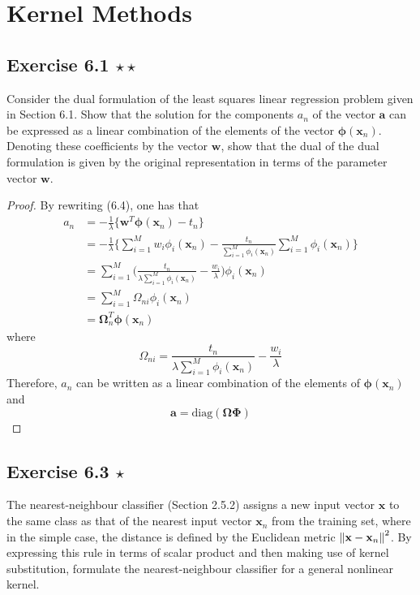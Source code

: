 \chapter{Kernel Methods}

\section*{Exercise 6.1 $\star \star$}
Consider the dual formulation of the least squares linear
regression problem given in Section 6.1. Show that the
solution for the components $a_n$ of the vector
$\mathbf{a}$ can be expressed as a linear combination of the
elements of the vector $\bm{\phi}(\mathbf{x}_n)$. Denoting 
these coefficients by the vector $\mathbf{w}$, show
that the dual of the dual formulation is given by
the original representation in terms of the parameter vector
$\mathbf{w}$.

\vspace{1em}

\begin{proof}
    By rewriting (6.4), one has that
    \begin{align*}
        a_n 
        &= -\frac{1}{\lambda} \{\mathbf{w}^T \bm{\phi}(\mathbf{x}_n) - t_n\} \\
        &= -\frac{1}{\lambda} \bigg\{\sum_{i=1}^{M} w_i \phi_i(\mathbf{x}_n) 
            - \frac{t_n}{\sum_{i=1}^{M} \phi_i(\mathbf{x}_n)} \sum_{i=1}^{M} \phi_i(\mathbf{x}_n)
        \bigg\} \\
        &= \sum_{i=1}^{M} \bigg(
            \frac{t_n}{\lambda \sum_{i=1}^{M} \phi_i(\mathbf{x}_n)} - \frac{w_i}{\lambda}\bigg)
            \phi_i(\mathbf{x}_n) \\
        &= \sum_{i=1}^{M} \Omega_{ni} \phi_i(\mathbf{x}_n) \\
        &= \bm{\Omega}_n^T \bm{\phi}(\mathbf{x}_n)
    \end{align*}
    where
    \[
        \Omega_{ni} = 
            \frac{t_n}{\lambda \sum_{i=1}^{M} \phi_i(\mathbf{x}_n)} - \frac{w_i}{\lambda}
    \] 
    Therefore, $a_n$ can be written as a linear combination of the elements
    of $\bm{\phi}(\mathbf{x}_n)$ and
    \[
        \mathbf{a} = \text{diag}(\bm{\Omega}\bm{\Phi})
    \] 
\end{proof}

\section*{Exercise 6.3 $\star$}
The nearest-neighbour classifier (Section 2.5.2) assigns
a new input vector $\mathbf{x}$ to the same class as that of the nearest input
vector $\mathbf{x}_n$ from the training set, where in the simple case,
the distance is defined by the Euclidean metric $\norm{\mathbf{x} - \mathbf{x}_n}^2$.
By expressing this rule in terms of scalar product and then making use of kernel
substitution, formulate the nearest-neighbour classifier for a general nonlinear kernel.

